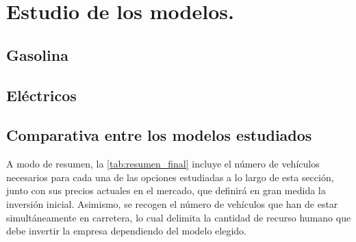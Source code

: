 \newpage
\section{Estudio de los modelos.}
\label{Estudio de los modelos}
\subsection{Gasolina}


\subsection{Eléctricos}

%

\subsection{Comparativa entre los modelos estudiados}
A modo de resumen, la \autoref{tab:resumen_final}
incluye el número de vehículos necesarios para cada una de las opciones estudiadas a lo largo de esta sección, junto con sus precios actuales en el mercado, que definirá en gran medida la inversión inicial. Asimismo, se recogen el número de vehículos que han de estar simultáneamente en carretera, lo cual delimita la cantidad de recurso humano que debe invertir la empresa dependiendo del modelo elegido.

